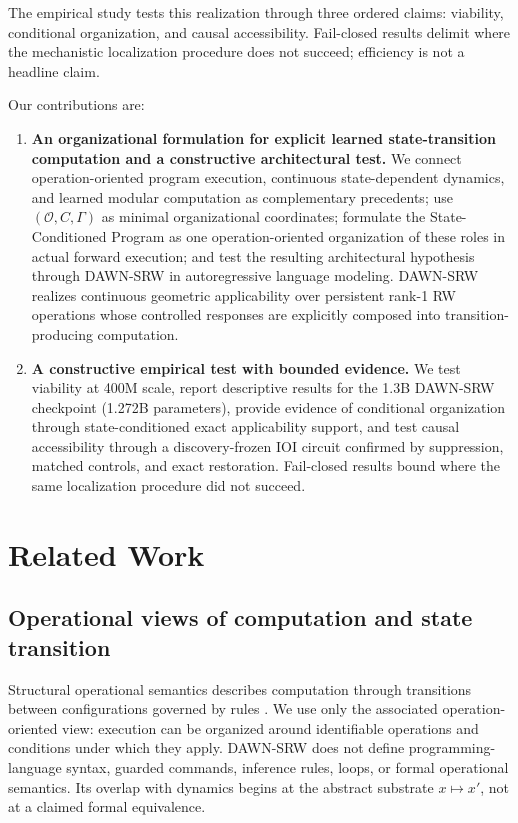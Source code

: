 \documentclass{article}
\newcommand{\DAWN}{DAWN-SRW}
\begin{document}
The empirical study tests this realization through three ordered claims:
viability, conditional organization, and causal accessibility. Fail-closed
results delimit where the mechanistic localization procedure does not succeed;
efficiency is not a headline claim.

Our contributions are:
\begin{enumerate}
    \item \textbf{An organizational formulation for explicit learned
    state-transition computation and a constructive architectural test.} We
    connect operation-oriented program execution, continuous state-dependent
    dynamics, and learned modular computation as complementary precedents; use
    \((\mathcal O,C,\Gamma)\) as minimal organizational coordinates; formulate
    the State-Conditioned Program as one operation-oriented organization of these
    roles in actual forward execution; and test the resulting architectural
    hypothesis through \DAWN{} in autoregressive language modeling. \DAWN{}
    realizes continuous geometric applicability over persistent rank-1 RW
    operations whose controlled responses are explicitly composed into
    transition-producing computation.
    \item \textbf{A constructive empirical test with bounded evidence.} We test
    viability at 400M scale, report descriptive results for the 1.3B \DAWN{}
    checkpoint (1.272B parameters), provide evidence of conditional organization
    through state-conditioned exact applicability support, and test causal
    accessibility through a discovery-frozen IOI circuit confirmed by
    suppression, matched controls, and exact restoration. Fail-closed results
    bound where the same localization procedure did not succeed.
\end{enumerate}

\section{Related Work}
\label{sec:related}

\subsection{Operational views of computation and state transition}

Structural operational semantics describes computation through transitions
between configurations governed by rules \cite{plotkin1981structural}. We use
only the associated operation-oriented view: execution can be organized around
identifiable operations and conditions under which they apply. \DAWN{} does not
define programming-language syntax, guarded commands, inference rules, loops, or
formal operational semantics. Its overlap with dynamics begins at the abstract
substrate \(x\mapsto x'\), not at a claimed formal equivalence.
\end{document}
